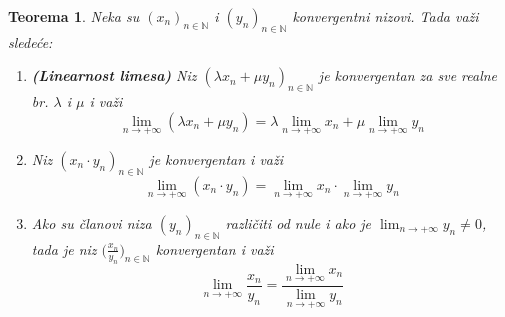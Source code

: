 \documentclass[a4paper,12pt]{article}
\theoremstyle{plain}
\newtheorem{theorem}{Teorema}[section]
\theoremstyle{definition}
\theoremstyle{remark}
\begin{document}
\begin{theorem}
    Neka su $(x_n)_{n \in \mathbb{N}}$ i $(y_n)_{n \in \mathbb{N}}$ konvergentni 
    nizovi. Tada važi sledeće:
    \begin{enumerate}
        \item \textbf{(Linearnost limesa)} Niz $(\lambda x_n + \mu y_n)_{n \in \mathbb{N}}$ je konvergentan za sve realne br. $\lambda$ i $\mu$ i važi
        \[ \lim_{n \to +\infty}(\lambda x_n + \mu y_n) = \lambda \lim_{n \to +\infty}x_n + \mu \lim_{n \to +\infty}y_n \]
        \item Niz $(x_n \cdot y_n)_{n \in \mathbb{N}}$ je konvergentan i važi
        \[ \lim_{n \to +\infty}(x_n \cdot y_n) = \lim_{n \to +\infty} x_n \cdot \lim_{n \to + \infty}y_n \]
        \item Ako su članovi niza $(y_n)_{n \in \mathbb{N}}$ različiti od nule i ako je $\displaystyle \lim_{n \to +\infty} y_n \neq 0$, tada je niz $\displaystyle \bigg(\frac{x_n}{y_n}\bigg)_{n \in \mathbb{N}}$ konvergentan i važi
        \[ \lim_{n \to +\infty}\frac{x_n}{y_n}= \frac{\displaystyle \lim_{n \to +\infty} x_n}{\displaystyle \lim_{n \to +\infty} y_n} \]
    \end{enumerate}
\end{theorem}
\end{document}
